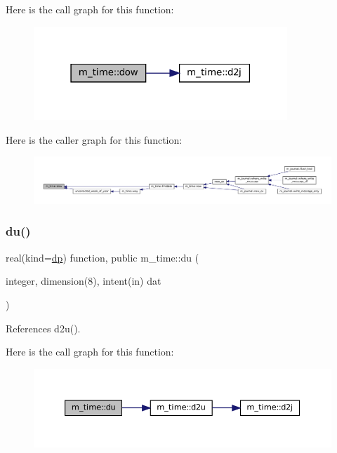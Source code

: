Here is the call graph for this function\+:\nopagebreak
\begin{figure}[H]
\begin{center}
\leavevmode
\includegraphics[width=271pt]{namespacem__time_adfda8a89820b8d0ad4581a14896e4ce5_cgraph}
\end{center}
\end{figure}
Here is the caller graph for this function\+:\nopagebreak
\begin{figure}[H]
\begin{center}
\leavevmode
\includegraphics[width=350pt]{namespacem__time_adfda8a89820b8d0ad4581a14896e4ce5_icgraph}
\end{center}
\end{figure}
\mbox{\label{namespacem__time_af1b675ed3256cd2ac10d461b8f1c7da8}} 
\subsubsection{\texorpdfstring{du()}{du()}}
{\footnotesize\ttfamily real(kind=\mbox{\hyperlink{namespacem__time_a95f16e7435244d114f0a451625dc189a}{dp}}) function, public m\+\_\+time\+::du (\begin{DoxyParamCaption}\item[{integer, dimension(8), intent(in)}]{dat }\end{DoxyParamCaption})}



References d2u().

Here is the call graph for this function\+:\nopagebreak
\begin{figure}[H]
\begin{center}
\leavevmode
\includegraphics[width=350pt]{namespacem__time_af1b675ed3256cd2ac10d461b8f1c7da8_cgraph}
\end{center}
\end{figure}
\mbox{\label{namespacem__time_a2cb84c9b8af4f395b76aed76e1431328}} 
